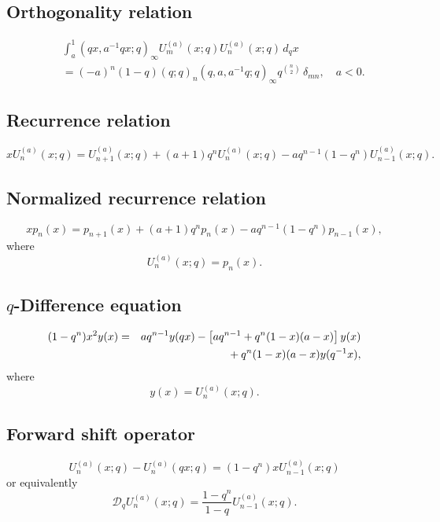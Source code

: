 \documentclass[envcountchap,graybox]{svmono}
\newcommand{\mathindent}{\hspace{7.5mm}}
\begin{document}
\subsection*{Orthogonality relation}
\begin{eqnarray}
\label{OrtAlSalamCarlitzI}
& &\int_a^1(qx,a^{-1}qx;q)_{\infty}U_m^{(a)}(x;q)U_n^{(a)}(x;q)\,d_qx\nonumber\\
& &{}=(-a)^n(1-q)(q;q)_n(q,a,a^{-1}q;q)_{\infty}q^{\binom{n}{2}}\,\delta_{mn},\quad a<0.
\end{eqnarray}

\subsection*{Recurrence relation}
\begin{equation}
\label{RecAlSalamCarlitzI}
xU_n^{(a)}(x;q)=U_{n+1}^{(a)}(x;q)+(a+1)q^nU_n^{(a)}(x;q)
-aq^{n-1}(1-q^n)U_{n-1}^{(a)}(x;q).
\end{equation}

\subsection*{Normalized recurrence relation}
\begin{equation}
\label{NormRecAlSalamCarlitzI}
xp_n(x)=p_{n+1}(x)+(a+1)q^np_n(x)-aq^{n-1}(1-q^n)p_{n-1}(x),
\end{equation}
where
$$U_n^{(a)}(x;q)=p_n(x).$$

\subsection*{$q$-Difference equation}
\begin{eqnarray}
\label{dvAlSalamCarlitzI}
(1-q^n)x^2y(x)&=&aq^{n-1}y(qx)-\left[aq^{n-1}+q^n(1-x)(a-x)\right]y(x)\nonumber\\
& &{}\mathindent{}+q^n(1-x)(a-x)y(q^{-1}x),
\end{eqnarray}
where
$$y(x)=U_n^{(a)}(x;q).$$

\subsection*{Forward shift operator}
\begin{equation}
\label{shift1AlSalamCarlitzI-I}
U_n^{(a)}(x;q)-U_n^{(a)}(qx;q)=(1-q^n)xU_{n-1}^{(a)}(x;q)
\end{equation}
or equivalently
\begin{equation}
\label{shift1AlSalamCarlitzI-II}
\mathcal{D}_qU_n^{(a)}(x;q)=\frac{1-q^n}{1-q}U_{n-1}^{(a)}(x;q).
\end{equation}
\end{document}
